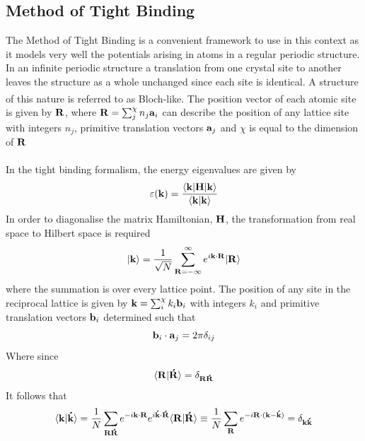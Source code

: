 \documentclass[a4paper, 12pt]{article}
\begin{document}
	\subsection{Method of Tight Binding}\label{tb}
	The Method of Tight Binding is a convenient framework to use in this context as it models very well the potentials arising in atoms in a regular periodic structure. 
	In an infinite periodic structure a translation from one crystal site to another leaves the structure as a whole unchanged since each site is identical. A structure of this nature is referred to as Bloch-like\textsuperscript{\textcolor{blue}{\cite{kittel_1996}}}.
	The position vector of each atomic site is given by $\bf R$,
		where ${\bf R} = \sum_j^\chi n_j{\bf a}_i$ can describe the position of any lattice site with integers $n_j$, primitive translation vectors ${\bf a}_j$ and $\chi$ is equal to the dimension of $\bf R$ \\ 
		\\In the tight binding formalism, the energy eigenvalues are given by 
		\begin{equation}
			\varepsilon({\bf k}) = \frac{\langle {\bf k}|{\bf H}|{\bf k} \rangle}{\langle\bf k|k\rangle}
		\end{equation}
		In order to diagonalise the matrix Hamiltonian, $\bf H$, the transformation from real space to Hilbert space is required
		\begin{equation}\label{kkk}
			|{\bf k}\rangle = \frac{1}{\sqrt{N}}\sum_{\bf R = -\infty}^\infty e^{i{\bf k}\cdot \bf R} |\bf R\rangle
		\end{equation}
		where the summation is over every lattice point. The position of any site in the reciprocal lattice is given by ${\bf k} = \sum_i^\chi k_i{\bf b}_i$ with integers $k_i$ and primitive translation vectors ${\bf b}_i$ determined such that 
		\begin{equation}
		{\bf b}_i\cdot {\bf a}_j = 2\pi \delta_{i j}
			\label{ab}
		\end{equation}
Where since 
		\begin{equation}
			\langle{\bf R}|{\bf \acute{R}}\rangle = \delta_{\bf R \acute{R}}
		\end{equation}
		It follows that
		\begin{equation}
			\label{kk}
			\langle{\bf k}|{\bf \acute{k}}\rangle = \frac{1}{N}\sum_{\bf R \acute{R}} e^{-i{\bf k}\cdot{\bf R}}e^{i{\bf \acute{k}}\cdot{\bf \acute{R}}} \langle{\bf R | \acute{R}}\rangle \equiv \frac{1}{N}\sum_{\bf R} e^{-i{\bf R\cdot(k-\acute{k})}}=\delta_{\bf k \acute{k}}
		\end{equation}
\end{document}
